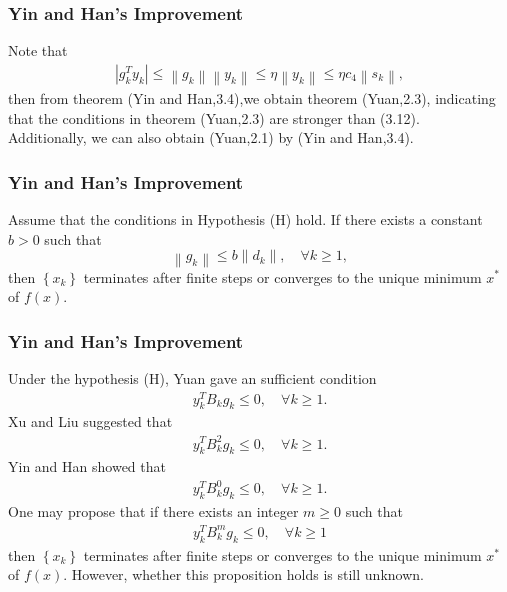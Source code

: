 \documentclass{beamer}
\begin{document}
\begin{frame}
\frametitle{Yin and Han's Improvement} 
Note that
\begin{align*}
    \left|g_k^T y_k\right| \leq\left\|g_k\right\|\left\|y_k\right\| \leq \eta\left\|y_k\right\| \leq \eta c_4\left\|s_k\right\|,
\end{align*}
then from theorem (Yin and Han,3.4),we obtain theorem (Yuan,2.3), indicating that the conditions in theorem (Yuan,2.3) are stronger than  (3.12).\\
Additionally, we can also obtain (Yuan,2.1) by (Yin and Han,3.4).
\end{frame}

\begin{frame}
\frametitle{Yin and Han's Improvement} 
\begin{theorem}
    Assume that the conditions in Hypothesis (H) hold. If there exists a constant $b>0$ such that \begin{equation*}
    \left\|g_k\right\| \leq b\left\|d_k\right\|, \quad \forall k \geq 1,
\end{equation*}
then $\left\{x_k\right\}$ terminates after finite steps or converges to the unique minimum $x^{*}$ of $f(x)$.
\end{theorem}
\end{frame}

\begin{frame}
\frametitle{Yin and Han's Improvement} 
Under the hypothesis (H), Yuan\cite{Yuan} gave an sufficient condition
\begin{align*}
    y_k^T B_k g_k \leq 0, \quad \forall k \geq 1.
\end{align*}
Xu and Liu\cite{XL} suggested that
\begin{align*}
    y_k^T B_k^2 g_k \leq 0, \quad \forall k \geq 1.
\end{align*}
Yin and Han\cite{YH} showed that
\begin{align*}
    y_k^T B_k^0 g_k \leq 0, \quad \forall k \geq 1.
\end{align*}
One may propose that if there exists an integer $m\geq0$ such that
\begin{align*}
    y_k^T B_k^m g_k \leq 0, \quad \forall k \geq 1
\end{align*}
then $\left\{x_k\right\}$ terminates after finite steps or converges to the unique minimum $x^{*}$ of $f(x)$. However, whether this proposition holds is still unknown.
\end{frame}
\end{document}
